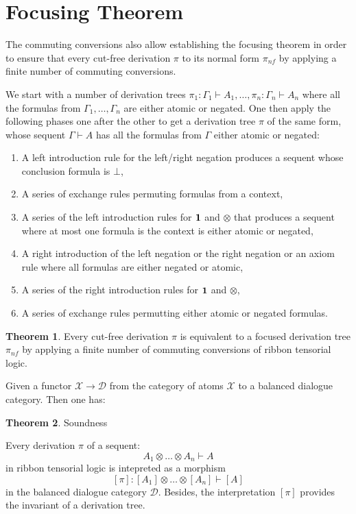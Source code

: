\documentclass[8pt]{article}
\theoremstyle{definition}
\theoremstyle{definition}
\newtheorem{theorem}{Theorem}[section]
\theoremstyle{definition}
\theoremstyle{definition}
\theoremstyle{definition}
\theoremstyle{definition}
\theoremstyle{definition}
\theoremstyle{definition}
\theoremstyle{definition}
\theoremstyle{definition}
\theoremstyle{definition}
\theoremstyle{definition}
\theoremstyle{definition}
\theoremstyle{definition}
\theoremstyle{question}
\begin{document}
\section{Focusing Theorem}

The commuting conversions also allow establishing the focusing theorem in order to ensure that every cut-free derivation $\pi$
to its normal form $\pi_{nf}$ by applying a finite number of commuting conversions.

We start with a number of derivation trees $\pi_1 : \Gamma_1 \vdash A_1, \ldots, \pi_n : \Gamma_n \vdash A_n$
where all the formulas from $\Gamma_1, \ldots, \Gamma_n$ are either atomic or negated. One then apply the following phases
one after the other to get a derivation tree $\pi$ of the same form, whose sequent $\Gamma \vdash A$ has all the formulas from $\Gamma$ either atomic or negated:
\begin{enumerate}
  \item A left introduction rule for the left/right negation produces a sequent whose conclusion formula is $\bot$,
  \item A series of exchange rules permuting formulas from a context,
  \item A series of the left introduction rules for ${\bf 1}$ and $\otimes$ that produces a sequent where at most one formula is the context is
  either atomic or negated,
  \item A right introduction of the left negation or the right negation or an axiom rule where all formulas are either negated or atomic,
  \item A series of the right introduction rules for ${\bf 1}$ and $\otimes$,
  \item A series of exchange rules permutting either atomic or negated formulas.
\end{enumerate}

\begin{theorem}
  Every cut-free derivation $\pi$ is equivalent to a focused derivation tree $\pi_{nf}$ by applying a finite number of commuting conversions of ribbon tensorial logic.
\end{theorem}

Given a functor $\mathcal{X} \to \mathcal{D}$ from the category of atoms $\mathcal{X}$ to a balanced dialogue category.
Then one has:
\begin{theorem}{Soundness}

  Every derivation $\pi$ of a sequent:
  \[
  A_1 \otimes \ldots \otimes A_n \vdash A
  \]
  in ribbon tensorial logic is intepreted as a morphism
  \[
  [\pi] : [A_1] \otimes \ldots \otimes [A_n] \vdash [A]
  \]
  in the balanced dialogue category $\mathcal{D}$. Besides, the interpretation $[\pi]$ provides the invariant of
  a derivation tree.
\end{theorem}
\end{document}

